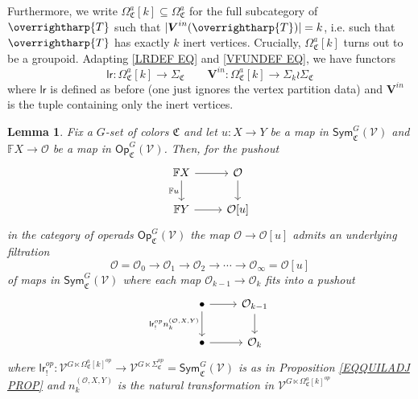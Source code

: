 \documentclass[a4paper,10pt
,draft
]{article}%
\numberwithin{equation}{section}
\numberwithin{figure}{section}
\newtheorem{lemma}[equation]{Lemma}%
\theoremstyle{definition} %
\newcommand{\vect}[1]{\text{\overrightharp{\ensuremath{#1}}}}
\newcommand{\V}{\ensuremath{\mathcal V}}
\renewcommand{\O}{\ensuremath{\mathcal O}}
\newcommand{\1}{\ensuremath{\mathbbm 1}}%
\begin{document}
Furthermore, we write
$\Omega_{\mathfrak C}^a[k] \subseteq \Omega_{\mathfrak C}^a$
for the full subcategory of $\vect{T}$ such that 
$|\boldsymbol{V}^{in}(\vect{T})| = k$,
i.e. such that $\vect{T}$ has exactly $k$ inert vertices.
Crucially, $\Omega^a_{\mathfrak{C}}[k]$
turns out to be a groupoid.
%
Adapting \eqref{LRDEF EQ} and \eqref{VFUNDEF EQ}, 
we have functors
\[
\mathsf{lr} \colon
\Omega^a_{\mathfrak{C}}[k]
\to
\Sigma_{\mathfrak{C}}
	\qquad
\boldsymbol{V}^{in} \colon
\Omega^a_{\mathfrak{C}}[k]
\to
\Sigma_k \wr \Sigma_{\mathfrak{C}}
\]
where $\mathsf{lr}$ is defined as before (one just ignores the vertex partition data)
and $\boldsymbol{V}^{in}$ is the tuple containing only the inert vertices.



\begin{lemma}\label{OURE LEM}
Fix a $G$-set of colors $\mathfrak{C}$ and let
$u\colon X \to Y$ be a map in $\mathsf{Sym}^G_{\mathfrak{C}}(\V)$
and
$\mathbb{F} X \to \O$ be a map in $\mathsf{Op}^G_{\mathfrak{C}}(\V)$.
Then, for the pushout 
\begin{equation}\label{OURE EQ}
\begin{tikzcd}
	\mathbb F X \arrow[d, "\mathbb{F}u"'] \arrow[r]
&
	\O \arrow[d]
\\
	\mathbb F Y \arrow[r]
&
\O[u]
\end{tikzcd}
\end{equation}
in the category of operads $\mathsf{Op}^G_{\mathfrak{C}}(\V)$
the map $\O \to \O[u]$ admits an underlying filtration
\begin{equation}\label{OUFILRE EQ}
\O = \O_0 \to \O_1 \to \O_2 \to \cdots \to \O_{\infty} = \O[u]
\end{equation}
of maps in $\mathsf{Sym}^G_{\mathfrak{C}}(\V)$ 
where each map $\O_{k-1} \to \O_k$ fits into a pushout
\begin{equation}\label{OUPUSHRE EQ}
\begin{tikzcd}
	\bullet 
	\arrow{d}[swap]{\mathsf{lr}^{op}_!
	n_k^{(\O,X,Y)}}
	 \arrow[r]
&
	\O_{k-1} \arrow[d]
\\
	\bullet \arrow[r]
&
	\O_k
\end{tikzcd}
\end{equation}
where 
$
\mathsf{lr}^{op}_! \colon
\mathcal{V}^{G \ltimes \Omega^a_{\mathfrak{C}}[k]^{op}}
\to
\mathcal{V}^{G \ltimes \Sigma_{\mathfrak{C}}^{op}}
=
\mathsf{Sym}^G_{\mathfrak{C}}(\V)
$
is as in Proposition \ref{EQQUILADJ PROP}
and $n_k^{(\O,X,Y)}$ is the natural transformation in 
$\mathcal{V}^{G \ltimes \Omega^a_{\mathfrak{C}}[k]^{op}}$

\end{lemma}
\end{document}
